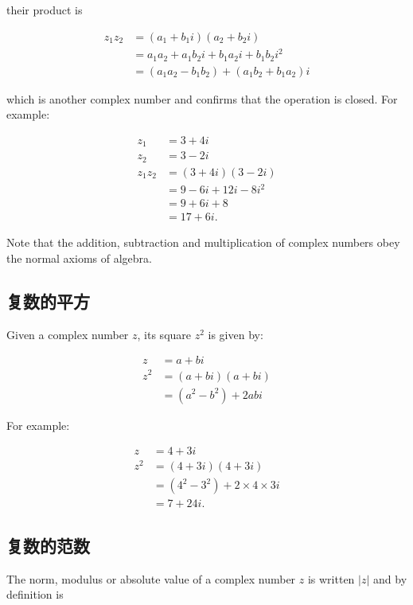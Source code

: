 their product is

$$
\begin{aligned}
z_{1} z_{2} & =\left(a_{1}+b_{1} i\right)\left(a_{2}+b_{2} i\right) \\
& =a_{1} a_{2}+a_{1} b_{2} i+b_{1} a_{2} i+b_{1} b_{2} i^{2} \\
& =\left(a_{1} a_{2}-b_{1} b_{2}\right)+\left(a_{1} b_{2}+b_{1} a_{2}\right) i
\end{aligned}
$$

which is another complex number and confirms that the operation is closed. For example:

$$
\begin{aligned}
z_{1} & =3+4 i \\
z_{2} & =3-2 i \\
z_{1} z_{2} & =(3+4 i)(3-2 i) \\
& =9-6 i+12 i-8 i^{2} \\
& =9+6 i+8 \\
& =17+6 i .
\end{aligned}
$$

Note that the addition, subtraction and multiplication of complex numbers obey the normal axioms of algebra.

\subsection{复数的平方}
Given a complex number $z$, its square $z^{2}$ is given by:

$$
\begin{aligned}
z & =a+b i \\
z^{2} & =(a+b i)(a+b i) \\
& =\left(a^{2}-b^{2}\right)+2 a b i
\end{aligned}
$$

For example:

$$
\begin{aligned}
z & =4+3 i \\
z^{2} & =(4+3 i)(4+3 i) \\
& =\left(4^{2}-3^{2}\right)+2 \times 4 \times 3 i \\
& =7+24 i .
\end{aligned}
$$

\subsection{复数的范数}
The norm, modulus or absolute value of a complex number $z$ is written $|z|$ and by definition is

